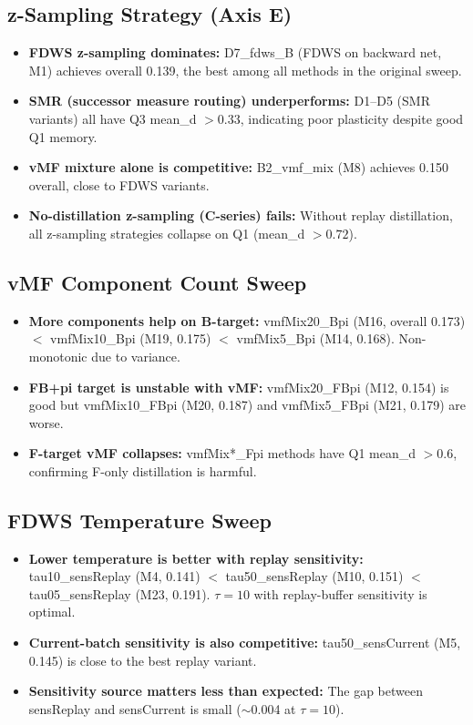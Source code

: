 \documentclass[11pt,a4paper]{article}
\begin{document}
\subsection{z-Sampling Strategy (Axis E)}

\begin{itemize}
    \item \textbf{FDWS z-sampling dominates:} D7\_fdws\_B (FDWS on backward net, M1) achieves
    overall 0.139, the best among all methods in the original sweep.
    \item \textbf{SMR (successor measure routing) underperforms:} D1--D5 (SMR variants) all have
    Q3 mean\_d $> 0.33$, indicating poor plasticity despite good Q1 memory.
    \item \textbf{vMF mixture alone is competitive:} B2\_vmf\_mix (M8) achieves 0.150 overall,
    close to FDWS variants.
    \item \textbf{No-distillation z-sampling (C-series) fails:} Without replay distillation,
    all z-sampling strategies collapse on Q1 (mean\_d $> 0.72$).
\end{itemize}

\subsection{vMF Component Count Sweep}

\begin{itemize}
    \item \textbf{More components help on B-target:} vmfMix20\_Bpi (M16, overall 0.173) $<$
    vmfMix10\_Bpi (M19, 0.175) $<$ vmfMix5\_Bpi (M14, 0.168). Non-monotonic due to variance.
    \item \textbf{FB+pi target is unstable with vMF:} vmfMix20\_FBpi (M12, 0.154) is good
    but vmfMix10\_FBpi (M20, 0.187) and vmfMix5\_FBpi (M21, 0.179) are worse.
    \item \textbf{F-target vMF collapses:} vmfMix*\_Fpi methods have Q1 mean\_d $> 0.6$,
    confirming F-only distillation is harmful.
\end{itemize}

\subsection{FDWS Temperature Sweep}

\begin{itemize}
    \item \textbf{Lower temperature is better with replay sensitivity:}
    tau10\_sensReplay (M4, 0.141) $<$ tau50\_sensReplay (M10, 0.151) $<$
    tau05\_sensReplay (M23, 0.191).
    $\tau=10$ with replay-buffer sensitivity is optimal.
    \item \textbf{Current-batch sensitivity is also competitive:}
    tau50\_sensCurrent (M5, 0.145) is close to the best replay variant.
    \item \textbf{Sensitivity source matters less than expected:} The gap between
    sensReplay and sensCurrent is small ($\sim$0.004 at $\tau=10$).
\end{itemize}
\end{document}
